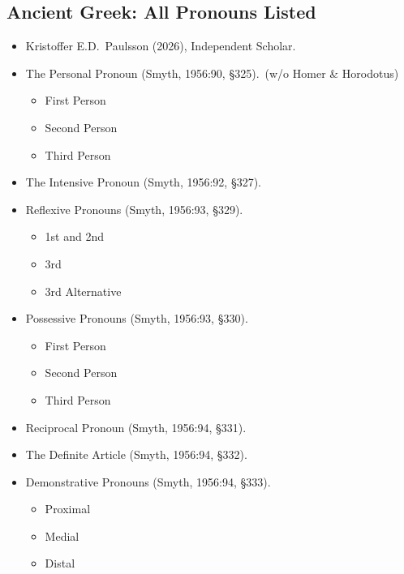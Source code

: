 \documentclass[10pt,a4paper,notitlepage]{article}
\begin{document}
    \subsection*{Ancient Greek: All Pronouns Listed}
    \begin{itemize}[label={}, leftmargin=0]
        \item Kristoffer E.D.\ Paulsson (2026), Independent Scholar.
    \end{itemize}

    \begin{itemize}
        \item The Personal Pronoun (Smyth, 1956:90, \S325).\ (w/o Homer \& Horodotus)
        \begin{itemize}
            \item First Person
            \item Second Person
            \item Third Person
        \end{itemize}
        \item The Intensive Pronoun (Smyth, 1956:92, \S327).
        \item Reflexive Pronouns (Smyth, 1956:93, \S329).
        \begin{itemize}
            \item 1st and 2nd
            \item 3rd
            \item 3rd Alternative
        \end{itemize}
        \item Possessive Pronouns (Smyth, 1956:93, \S330).
        \begin{itemize}
            \item First Person
            \item Second Person
            \item Third Person
        \end{itemize}
        \item Reciprocal Pronoun (Smyth, 1956:94, \S331).
        \item The Definite Article (Smyth, 1956:94, \S332).
        \item Demonstrative Pronouns (Smyth, 1956:94, \S333).
        \begin{itemize}
            \item Proximal
            \item Medial
            \item Distal
        \end{itemize}

\end{itemize}
\end{document}
